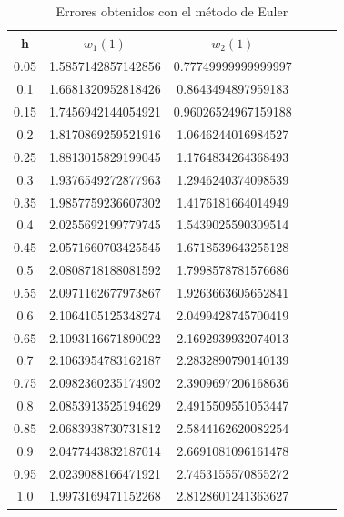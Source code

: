 \documentclass[12pt]{article}       %
\begin{document}
\begin{table}[H]
	\centering
	\setlength\extrarowheight{2.5pt}
	
	\begin{tabular}{|c|c|c|c|c|c}
		\hline
		\textbf{h} & {\textbf{$w_1(1)$}} & {\textbf{$w_2(1)$}}\\ 
		\hline
	     0.05 & 1.5857142857142856 & 0.77749999999999997 \\
		\hline
		  0.1 & 1.6681320952818426 & 0.8643494897959183 \\
		\hline
		 0.15 & 1.7456942144054921 & 0.96026524967159188 \\
		\hline
	     0.2 & 1.8170869259521916 & 1.0646244016984527 \\
		\hline
		 0.25 & 1.8813015829199045 & 1.1764834264368493 \\
		\hline
		  0.3 & 1.9376549272877963 & 1.2946240374098539  \\
		\hline
		 0.35 & 1.9857759236607302 & 1.4176181664014949  \\
		\hline
		  0.4 & 2.0255692199779745 & 1.5439025590309514  \\
		\hline
		 0.45 & 2.0571660703425545 & 1.6718539643255128 \\
		\hline
		  0.5 & 2.0808718188081592 & 1.7998578781576686  \\
		\hline
		 0.55 & 2.0971162677973867 & 1.9263663605652841  \\
		\hline
		  0.6 & 2.1064105125348274 & 2.0499428745700419  \\
		\hline
		 0.65 & 2.1093116671890022 & 2.1692939932074013  \\
		\hline
		  0.7 & 2.1063954783162187 & 2.2832890790140139 \\
		\hline
		 0.75 & 2.0982360235174902 & 2.3909697206168636  \\
		\hline
		  0.8 & 2.0853913525194629 & 2.4915509551053447  \\
		\hline
		 0.85 & 2.0683938730731812 & 2.5844162620082254  \\
		\hline
		  0.9 & 2.0477443832187014 & 2.6691081096161478  \\
		\hline
		 0.95 & 2.0239088166471921 & 2.7453155570855272  \\
		\hline
		  1.0 & 1.9973169471152268 & 2.8128601241363627  \\
		\hline
	\end{tabular}
	
	\caption{Errores obtenidos con el método de Euler}           
\end{table}
\end{document}
